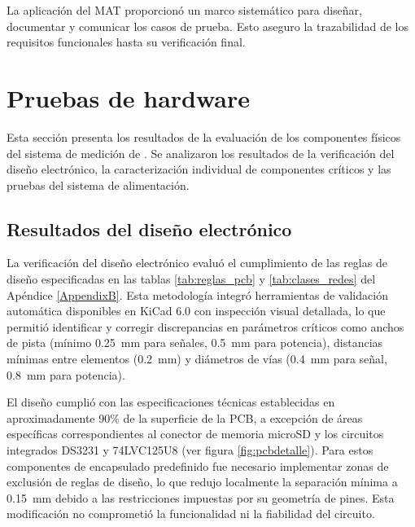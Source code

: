La aplicación del MAT proporcionó un marco sistemático para diseñar, documentar y comunicar los casos de prueba. Esto aseguro la trazabilidad de los requisitos funcionales hasta su verificación final.	


\section{Pruebas de hardware}

Esta sección presenta los resultados de la evaluación de los componentes físicos del sistema de medición de \MPF. Se analizaron los resultados de la verificación del diseño electrónico, la caracterización individual de componentes críticos y las pruebas del sistema de alimentación. 

\subsection{Resultados del diseño electrónico}

La verificación del diseño electrónico  evaluó el cumplimiento de las reglas de diseño especificadas en las tablas \ref{tab:reglas_pcb} y \ref{tab:clases_redes} del Apéndice \ref{AppendixB}. Esta metodología integró herramientas de validación automática disponibles en KiCad 6.0 con inspección visual detallada, lo que permitió identificar y corregir discrepancias en parámetros críticos como anchos de pista (mínimo \SI{0.25}{\milli\meter} para señales, \SI{0.5}{\milli\meter} para potencia), distancias mínimas entre elementos (\SI{0.2}{\milli\meter}) y diámetros de vías (\SI{0.4}{\milli\meter} para señal, \SI{0.8}{\milli\meter} para potencia).

El diseño cumplió con las especificaciones técnicas establecidas en aproximadamente 90\% de la superficie de la PCB, a excepción de áreas específicas correspondientes al conector de memoria microSD y los circuitos integrados DS3231 y 74LVC125U8 (ver figura \ref{fig:pcbdetalle}). Para estos componentes de encapsulado predefinido fue necesario implementar zonas de exclusión de reglas de diseño, lo que redujo localmente la separación mínima a \SI{0.15}{\milli\meter} debido a las restricciones impuestas por su geometría de pines. Esta modificación  no comprometió la funcionalidad ni la fiabilidad del circuito. 

